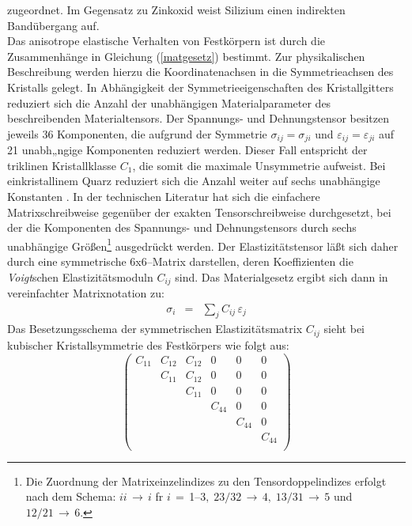 zugeordnet. Im Gegensatz zu Zinkoxid weist Silizium einen indirekten
Bandübergang auf.\\
Das anisotrope elastische Verhalten von Festkörpern ist durch die
Zusammenhänge in Gleichung (\ref{matgesetz}) bestimmt.
Zur physikalischen Beschreibung werden hierzu
die Koordinatenachsen in die Symmetrieachsen des Kristalls gelegt.  In
Abhängigkeit der Symmetrieeigenschaften des Kristallgitters reduziert
sich die Anzahl der unabhängigen Materialparameter des beschreibenden
Materialtensors. Der Spannungs- und Dehnungstensor besitzen jeweils 36
Komponenten, die aufgrund der Symmetrie $ \sigma_{ij} =
\sigma_{ji}$ und $\varepsilon_{ij}  =  \varepsilon_{ji} $ auf
21 unabh„ngige Komponenten reduziert werden.  Dieser Fall entspricht der
triklinen Kristallklasse $ C_{1} $, die somit die maximale Unsymmetrie
aufweist. Bei einkristallinem Quarz reduziert sich die Anzahl weiter
auf sechs unabhängige Konstanten \cite{Bri85, Tic80}. In der technischen
Literatur hat sich die einfachere Matrixschreibweise gegenüber der exakten
Tensorschreibweise durchgesetzt, bei der die Komponenten des Spannungs-
und Dehnungstensors durch sechs unabhängige Größen\footnote{Die Zuordnung
der Matrixeinzelindizes zu den Tensordoppelindizes erfolgt nach dem Schema:
$ii \, \rightarrow \, i$ fr $i \, = \,$1--3$, \; 23/32 \, \rightarrow \, 4,
 \; 13/31 \, \rightarrow \, 5$ und $12/21 \, \rightarrow \, 6$.}
ausgedrückt werden.
Der Elastizitätstensor läßt sich daher durch eine symmetrische
6x6--Matrix darstellen, deren
Koeffizienten die {\sl Voigt}schen Elastizitätsmoduln $C_{ij}$ sind. Das
Materialgesetz ergibt sich dann in vereinfachter Matrixnotation zu:
%
\begin{eqnarray}
\label{voigt}
 \sigma_{i} & = & \sum_{j} C_{ij} \, \varepsilon_{j}
\end{eqnarray}
%
Das Besetzungsschema der symmetrischen Elastizitätsmatrix $C_{ij}$ sieht
bei kubischer Kristallsymmetrie des Festkörpers wie folgt aus:
\begin{displaymath}
 \left ( \begin{array}{llllll}
         C_{11}  &  C_{12}   &   C_{12}  &    0   &    0   &   0 \\
                 &  C_{11}   &   C_{12}  &    0   &    0   &   0 \\
                 &           &   C_{11}  &    0   &    0   &   0 \\
                 &           &           & C_{44} &    0   &   0 \\
                 &           &           &        & C_{44} &   0 \\
                 &           &           &        &        & C_{44}\\
 \end{array}
 \right )
\end{displaymath}

